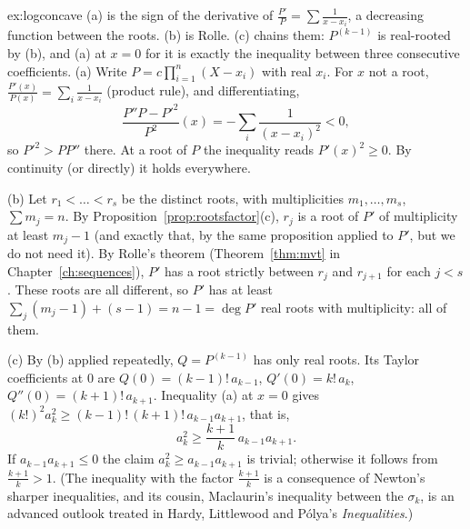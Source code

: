 \begin{solution}{ex:logconcave}
\idea (a) is the sign of the derivative of $\frac{P'}P=\sum\frac1{x-x_i}$, a decreasing function between the roots. (b) is Rolle. (c) chains them: $P^{(k-1)}$ is real-rooted by (b), and (a) at $x=0$ for it is exactly the inequality between three consecutive coefficients.
\writeup (a) Write $P=c\prod_{i=1}^n(X-x_i)$ with real $x_i$. For $x$ not a root, $\frac{P'(x)}{P(x)}=\sum_i\frac1{x-x_i}$ (product rule), and differentiating,
\[
\frac{P''P-P'^2}{P^2}(x)=-\sum_i\frac1{(x-x_i)^2}<0,
\]
so $P'^2>PP''$ there. At a root of $P$ the inequality reads $P'(x)^2\ge0$. By continuity (or directly) it holds everywhere.

(b) Let $r_1<\dots<r_s$ be the distinct roots, with multiplicities $m_1,\dots,m_s$, $\sum m_j=n$. By Proposition~\ref{prop:rootsfactor}(c), $r_j$ is a root of $P'$ of multiplicity at least $m_j-1$ (and exactly that, by the same proposition applied to $P'$, but we do not need it). By Rolle's theorem (Theorem~\ref{thm:mvt} in Chapter~\ref{ch:sequences}), $P'$ has a root strictly between $r_j$ and $r_{j+1}$ for each $j<s$. These roots are all different, so $P'$ has at least $\sum_j(m_j-1)+(s-1)=n-1=\deg P'$ real roots with multiplicity: all of them.

(c) By (b) applied repeatedly, $Q=P^{(k-1)}$ has only real roots. Its Taylor coefficients at $0$ are $Q(0)=(k-1)!\,a_{k-1}$, $Q'(0)=k!\,a_k$, $Q''(0)=(k+1)!\,a_{k+1}$. Inequality (a) at $x=0$ gives $(k!)^2a_k^2\ge(k-1)!\,(k+1)!\,a_{k-1}a_{k+1}$, that is,
\[
a_k^2\ge\frac{k+1}k\,a_{k-1}a_{k+1}.
\]
If $a_{k-1}a_{k+1}\le0$ the claim $a_k^2\ge a_{k-1}a_{k+1}$ is trivial; otherwise it follows from $\frac{k+1}k>1$. (The inequality with the factor $\frac{k+1}k$ is a consequence of Newton's sharper inequalities, and its cousin, Maclaurin's inequality between the $\sigma_k$, is an advanced outlook treated in Hardy, Littlewood and P\'olya's \emph{Inequalities}.)
\end{solution}

